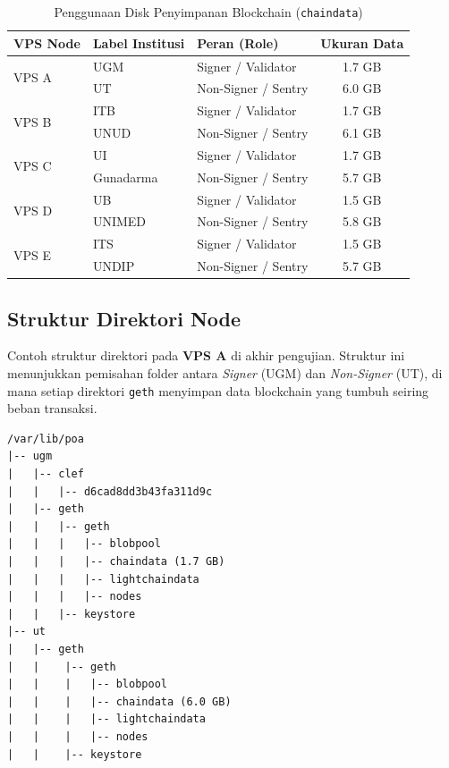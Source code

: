 \begin{table}[h]
\centering
\caption{Penggunaan Disk Penyimpanan Blockchain (\texttt{chaindata})}
\label{tab:storage_usage}
\begin{tabular}{|l|l|l|c|}
\hline
\textbf{VPS Node} & \textbf{Label Institusi} & \textbf{Peran (Role)} & \textbf{Ukuran Data} \\ \hline
\multirow{2}{*}{VPS A} & UGM & Signer / Validator & 1.7 GB \\ \cline{2-4} 
 & UT & Non-Signer / Sentry & 6.0 GB \\ \hline
\multirow{2}{*}{VPS B} & ITB & Signer / Validator & 1.7 GB \\ \cline{2-4} 
 & UNUD & Non-Signer / Sentry & 6.1 GB \\ \hline
\multirow{2}{*}{VPS C} & UI & Signer / Validator & 1.7 GB \\ \cline{2-4} 
 & Gunadarma & Non-Signer / Sentry & 5.7 GB \\ \hline
\multirow{2}{*}{VPS D} & UB & Signer / Validator & 1.5 GB \\ \cline{2-4} 
 & UNIMED & Non-Signer / Sentry & 5.8 GB \\ \hline
\multirow{2}{*}{VPS E} & ITS & Signer / Validator & 1.5 GB \\ \cline{2-4} 
 & UNDIP & Non-Signer / Sentry & 5.7 GB \\ \hline
\end{tabular}
\end{table}

\clearpage
\subsection{Struktur Direktori Node}
Contoh struktur direktori pada \textbf{VPS A} di akhir pengujian. Struktur ini menunjukkan pemisahan folder antara \textit{Signer} (UGM) dan \textit{Non-Signer} (UT), di mana setiap direktori \texttt{geth} menyimpan data blockchain yang tumbuh seiring beban transaksi.

\begin{small}
\begin{verbatim}
/var/lib/poa
|-- ugm
|   |-- clef
|   |   |-- d6cad8dd3b43fa311d9c
|   |-- geth
|   |   |-- geth
|   |   |   |-- blobpool
|   |   |   |-- chaindata (1.7 GB)
|   |   |   |-- lightchaindata
|   |   |   |-- nodes
|   |   |-- keystore
|-- ut
|   |-- geth
|   |    |-- geth
|   |    |   |-- blobpool
|   |    |   |-- chaindata (6.0 GB)
|   |    |   |-- lightchaindata
|   |    |   |-- nodes
|   |    |-- keystore
\end{verbatim}
\end{small}
